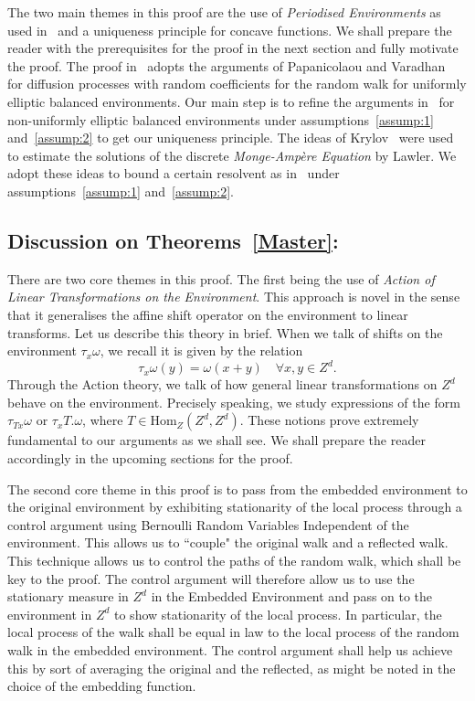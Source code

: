\documentclass[final]{aomart}
\def\mathbb#1{#1}%
\theoremstyle{plain}
\theoremstyle{definition}
\theoremstyle{remark}
\begin{document}
The two main themes in this proof are the use of \textit{Periodised Environments} as used in~\cite{Lawler1982} and a uniqueness principle for concave functions. We shall prepare the reader with the prerequisites for the proof in the next section and fully motivate the proof. The proof in~\cite{Lawler1982} adopts the arguments of Papanicolaou and Varadhan~\cite{PapanicolaouVaradhan1982} for diffusion processes with random coefficients for the random walk for uniformly elliptic balanced environments. Our main step is to refine the arguments in~\cite{Lawler1982} for non-uniformly elliptic balanced environments under assumptions~\ref{assump:1} and~\ref{assump:2} to get our uniqueness principle. The ideas of Krylov~\cite{Krylov1971} were used to estimate the solutions of the discrete \textit{Monge-Ampère Equation} by Lawler. We adopt these ideas to bound a certain resolvent as in~\cite{Lawler1982} under assumptions~\ref{assump:1} and~\ref{assump:2}. 
\subsection{Discussion on Theorems~\ref{Master}:}
There are two core themes in this proof. The first being the use of \textit{Action of Linear Transformations on the Environment}. This approach is novel in the sense that it generalises the affine shift operator on the environment to linear transforms. Let us describe this theory in brief. When we talk of shifts on the environment $\tau_x \omega$, we recall it is given by the relation \[
\tau_x\omega(y) = \omega(x+y)\quad \forall x,y\in \mathbb{Z}^d.
\]
Through the Action theory, we talk of how general linear transformations on $\mathbb{Z}^d$ behave on the environment. Precisely speaking, we study expressions of the form $\tau_{Tx} \omega$ or $\tau_x T.\omega$, where $T \in \mathrm{Hom}_\mathbb{Z}(\mathbb{Z}^d, \mathbb{Z}^d)$. These notions prove extremely fundamental to our arguments as we shall see. We shall prepare the reader accordingly in the upcoming sections for the proof.

The second core theme in this proof is to pass from the embedded environment to the original environment by exhibiting stationarity of the local process through a control argument using Bernoulli Random Variables Independent of the environment. This allows us to ``couple" the original walk and a reflected walk. This technique allows us to control the paths of the random walk, which shall be key to the proof.
The control argument will therefore allow us to use the stationary measure in $\mathbb{Z}^{d}$ in the Embedded Environment and pass on to the environment in $\mathbb{Z}^d$ to show stationarity of the local process. In particular, the local process of the walk shall be equal in law to the local process of the random walk in the embedded environment. The control argument shall help us achieve this by sort of averaging the original and the reflected, as might be noted in the choice of the embedding function. 
\end{document}
